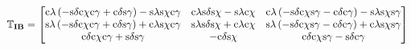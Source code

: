 \begin{equation} \label{eq:IBtrans}
\mathbb{T}_{\mathbf{IB}}=
\left[
\begin{matrix}
\text{c}\lambda\left(-\text{s}\delta \text{c}\chi \text{c}\gamma +\text{c}\delta \text{s}\gamma \right)-\text{s}\lambda \text{s}\chi \text{c}\gamma  & \text{c}\lambda \text{s}\delta \text{s}\chi -\text{s}\lambda \text{c}\chi & \text{c}\lambda\left(-\text{s}\delta \text{c}\chi \text{s}\gamma -\text{c}\delta \text{c}\gamma \right)-\text{s}\lambda \text{s}\chi \text{s}\gamma \\
\text{s}\lambda\left(-\text{s}\delta \text{c}\chi \text{c}\gamma +\text{c}\delta \text{s}\gamma \right)+\text{c}\lambda \text{s}\chi \text{c}\gamma & \text{s}\lambda \text{s}\delta \text{s}\chi +\text{c}\lambda \text{c}\chi & \text{s}\lambda\left(-\text{s}\delta \text{c}\chi \text{s}\gamma -\text{c}\delta \text{c}\gamma \right)+\text{c}\lambda \text{s}\chi \text{s}\gamma \\
\text{c}\delta \text{c}\chi \text{c}\gamma +\text{s}\delta \text{s}\gamma &  -\text{c}\delta \text{s}\chi &  \text{c}\delta \text{c}\chi \text{s}\gamma -\text{s}\delta \text{c}\gamma \\
\end{matrix}
\right]\\
\end{equation}




